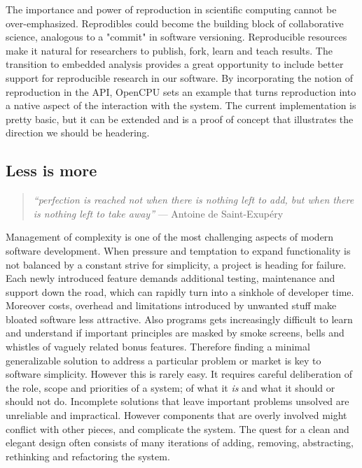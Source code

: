 The importance and power of reproduction in scientific computing cannot be over-emphasized. Reprodibles could become the building block of collaborative science, analogous to a "commit" in software versioning. Reproducible resources make it natural for researchers to publish, fork, learn and teach results. The transition to embedded analysis provides a great opportunity to include better support for reproducible research in our software. By incorporating the notion of reproduction in the API, OpenCPU sets an example that turns reproduction into a native aspect of the interaction with the system. The current implementation is pretty basic, but it can be extended and is a proof of concept that illustrates the direction we should be headering.  

\subsection{Less is more}

\begin{quote}
\emph{``perfection is reached not when there is nothing left to add, but when there is nothing left to take away''} --- Antoine de Saint-Exupéry
\end{quote}

\vspace{8pt}


\noindent Management of complexity is one of the most challenging aspects of modern software development. When pressure and temptation to expand functionality is not balanced by a constant strive for simplicity, a project is heading for failure. Each newly introduced feature demands additional testing, maintenance and support down the road, which can rapidly turn into a sinkhole of developer time. Moreover costs, overhead and limitations introduced by unwanted stuff make bloated software less attractive. Also programs gets increasingly difficult to learn and understand if important principles are masked by smoke screens, bells and whistles of vaguely related bonus features. Therefore finding a minimal generalizable solution to address a particular problem or market is key to software simplicity. However this is rarely easy. It requires careful deliberation of the role, scope and priorities of a system; of what it \emph{is} and what it should or should not do. Incomplete solutions that leave important problems unsolved are unreliable and impractical. However components that are overly involved might conflict with other pieces, and complicate the system. The quest for a clean and elegant design often consists of many iterations of adding, removing, abstracting, rethinking and refactoring the system.


